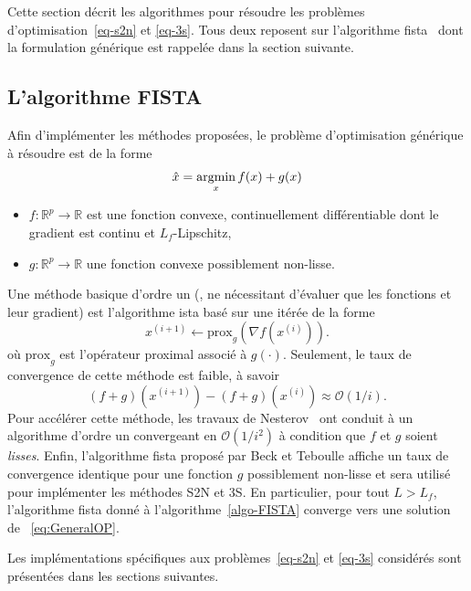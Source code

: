 Cette section décrit les algorithmes pour résoudre les problèmes d'optimisation~\eqref{eq-s2n} et \eqref{eq-3s}. Tous deux reposent sur l'algorithme \gls{fista}~\cite{beck_fast_2009} dont la formulation générique est rappelée dans la section suivante.

\subsection{L'algorithme FISTA}\label{sec-fista}

Afin d'implémenter les méthodes proposées, le problème d'optimisation générique à résoudre est de la forme
\begin{equation}
\hat{x} = \argmin_x f(x) + g(x) \label{eq:GeneralOP}
\end{equation}
\begin{itemize}
    \item $f : \mathbb{R}^p \to \mathbb{R}$ est une fonction convexe, continuellement différentiable dont le gradient est continu et $L_{f}$-Lipschitz,
    \item $g : \mathbb{R}^p \to \mathbb{R}$ une fonction convexe possiblement non-lisse.
\end{itemize}
Une méthode basique d'ordre un (\ie{}, ne nécessitant d'évaluer que les fonctions et leur gradient) est l'algorithme \gls{ista} basé sur une itérée de la forme
\begin{equation}
    x^{(i+1)} \leftarrow \mathrm{prox}_{g}( \nabla f(x^{(i)})).
\end{equation}
où $\mathrm{prox}_{g}$ est l'opérateur proximal associé à $g(\cdot)$. Seulement, le taux de convergence de cette méthode est faible, à savoir
\begin{equation}
(f+g)(x^{(i+1)}) - (f+g)(x^{(i)}) \approx \mathcal{O}(1/i).
\end{equation}
Pour accélérer cette méthode, les travaux de Nesterov~\cite{nesterov1983method} ont conduit à un algorithme  d'ordre un convergeant en $\mathcal{O}(1/i^2)$ à condition que $f$ et $g$ soient \emph{lisses}. Enfin, l'algorithme \gls{fista} proposé par Beck et Teboulle affiche un taux de convergence identique pour une fonction $g$ possiblement non-lisse et sera utilisé pour implémenter les méthodes S2N et 3S. En particulier, pour tout $L> L_{f}$, l'algorithme \gls{fista} donné à l'algorithme~\ref{algo-FISTA} converge vers une solution de ~\eqref{eq:GeneralOP}.

Les implémentations spécifiques aux problèmes~\eqref{eq-s2n} et \eqref{eq-3s} considérés sont présentées dans les sections suivantes.

